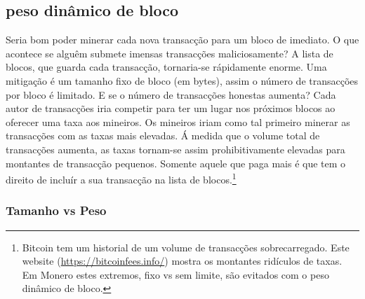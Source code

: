 
\subsection{peso dinâmico de bloco}
\label{subsec:dynamic-block-weight}

Seria bom poder minerar cada nova transacção para um bloco de imediato. O que acontece se alguêm submete imensas transacções maliciosamente? A lista de blocos, que guarda cada transacção, tornaria-se rápidamente enorme. 
Uma mitigação é um tamanho fixo de bloco (em bytes), assim o número de transacções por bloco é limitado. E se o número de transacções honestas aumenta? Cada autor de transacções iria competir para ter um lugar nos próximos blocos ao oferecer uma taxa aos mineiros. Os mineiros iriam como tal primeiro minerar as transacções com as taxas mais elevadas. Á medida que o volume total de transacções aumenta, as taxas tornam-se assim prohibitivamente elevadas para montantes de transacção pequenos. Somente aquele que paga mais é que tem o direito de incluír a sua transacção na lista de blocos.\footnote{Bitcoin tem um historial de um volume de transacções sobrecarregado. Este website (\url{https://bitcoinfees.info/}) mostra os montantes ridículos de taxas.
Em Monero estes extremos, fixo vs sem limite, são evitados com o peso dinâmico de bloco.} 

\subsubsection{Tamanho vs Peso}

